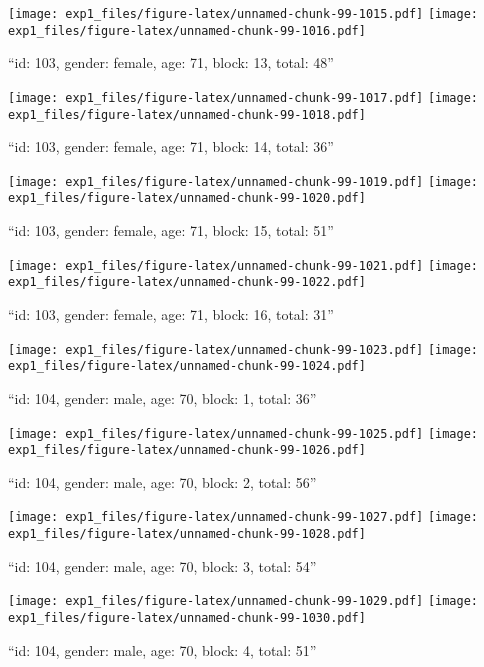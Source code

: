 \documentclass[,]{article}
\begin{document}
\texttt{[image: exp1\_files/figure-latex/unnamed-chunk-99-1015.pdf]}
\texttt{[image: exp1\_files/figure-latex/unnamed-chunk-99-1016.pdf]}

\newpage
[1] 

``id: 103, gender: female, age: 71, block: 13, total: 48''

\texttt{[image: exp1\_files/figure-latex/unnamed-chunk-99-1017.pdf]}
\texttt{[image: exp1\_files/figure-latex/unnamed-chunk-99-1018.pdf]}

\newpage
[1] 

``id: 103, gender: female, age: 71, block: 14, total: 36''

\texttt{[image: exp1\_files/figure-latex/unnamed-chunk-99-1019.pdf]}
\texttt{[image: exp1\_files/figure-latex/unnamed-chunk-99-1020.pdf]}

\newpage
[1] 

``id: 103, gender: female, age: 71, block: 15, total: 51''

\texttt{[image: exp1\_files/figure-latex/unnamed-chunk-99-1021.pdf]}
\texttt{[image: exp1\_files/figure-latex/unnamed-chunk-99-1022.pdf]}

\newpage
[1] 

``id: 103, gender: female, age: 71, block: 16, total: 31''

\texttt{[image: exp1\_files/figure-latex/unnamed-chunk-99-1023.pdf]}
\texttt{[image: exp1\_files/figure-latex/unnamed-chunk-99-1024.pdf]}

\newpage
[1] 

``id: 104, gender: male, age: 70, block: 1, total: 36''

\texttt{[image: exp1\_files/figure-latex/unnamed-chunk-99-1025.pdf]}
\texttt{[image: exp1\_files/figure-latex/unnamed-chunk-99-1026.pdf]}

\newpage
[1] 

``id: 104, gender: male, age: 70, block: 2, total: 56''

\texttt{[image: exp1\_files/figure-latex/unnamed-chunk-99-1027.pdf]}
\texttt{[image: exp1\_files/figure-latex/unnamed-chunk-99-1028.pdf]}

\newpage
[1] 

``id: 104, gender: male, age: 70, block: 3, total: 54''

\texttt{[image: exp1\_files/figure-latex/unnamed-chunk-99-1029.pdf]}
\texttt{[image: exp1\_files/figure-latex/unnamed-chunk-99-1030.pdf]}

\newpage
[1] 

``id: 104, gender: male, age: 70, block: 4, total: 51''
\end{document}
